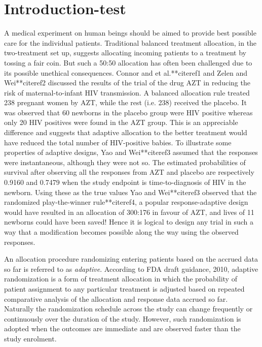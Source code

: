 \section{Introduction-test}
A medical experiment on human beings should
be aimed to provide best possible care for the individual patients.
Traditional balanced treatment allocation, in the two-treatment set up, suggests allocating incoming patients to a treatment by tossing a fair coin. But such a 50:50 allocation has often been challenged due to its possible
unethical consequences. Connor and et al.**citeref{1} and Zelen and Wei**citeref{2} discussed the results of the trial of the drug AZT in reducing the risk of maternal-to-infant HIV transmission. A balanced allocation rule treated 238 pregnant women by AZT, while the rest (i.e. 238) received the placebo. It was observed that 60 newborns in the placebo group were
HIV positive whereas only 20 HIV positives were found in the AZT group. This is an appreciable difference and suggests that adaptive allocation to the better treatment would have reduced the total number of HIV-positive babies. To illustrate some properties of adaptive designs, Yao and Wei**citeref{3} assumed that the responses were instantaneous, although they were not so. The estimated probabilities of survival after observing all the responses from AZT and placebo are respectively 0.9160 and 0.7479 when the study endpoint is time-to-diagnosis of HIV in the newborn. Using these as the true values Yao and Wei**citeref{3} observed that the randomized play-the-winner rule**citeref{4}, a popular response-adaptive design would have resulted in an allocation of 300:176 in favour of AZT, and lives of 11 newborns could have been saved! Hence it is logical to design any trial in such a way that a modification becomes possible along the way using the observed responses.

An allocation procedure randomizing  entering patients based on the accrued data so far is referred to as \textit{adaptive}. According to FDA draft guidance, 2010, adaptive randomization is a form of treatment allocation in which the probability of patient assignment to any particular treatment is adjusted based on repeated comparative analysis of the allocation and response data  accrued so far. Naturally the randomization schedule across the study can change frequently or continuously over the duration of the study. However, such randomization is adopted when the outcomes are immediate and  are observed faster than the study enrolment.

